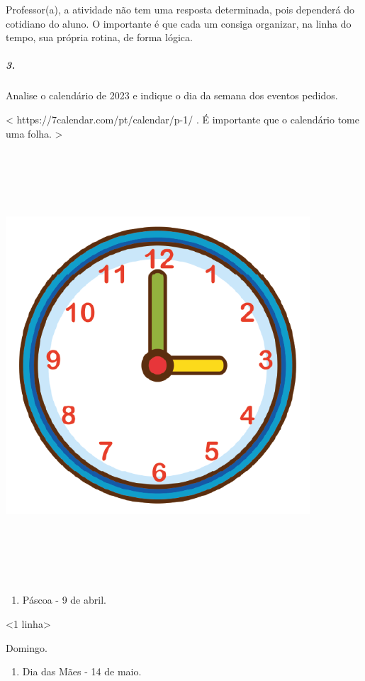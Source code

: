 Professor(a), a atividade não tem uma resposta determinada, pois dependerá do cotidiano do aluno. O importante é que cada um consiga organizar, na linha do tempo, sua própria rotina, de forma lógica.

\subparagraph{3.}\label{section-45}

Analise o calendário de 2023 e indique o dia da semana dos eventos pedidos.

\textless{} https://7calendar.com/pt/calendar/p-1/ . É importante que o
calendário tome uma folha. \textgreater{}

\includegraphics[width=4.46875in,height=6.30882in]{media/image60.png}

\begin{enumerate}
\def\labelenumi{\alph{enumi})}
\item
  Páscoa - 9 de abril.
\end{enumerate}

\textless{}1 linha\textgreater{}

Domingo.

\begin{enumerate}
\def\labelenumi{\alph{enumi})}
\item
  Dia das Mães - 14 de maio.
\end{enumerate}

